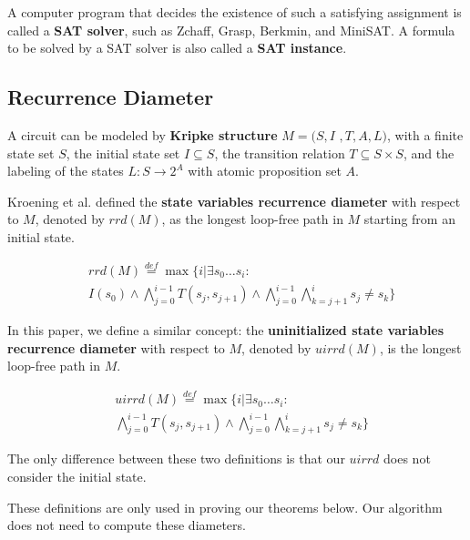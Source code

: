\documentclass[journal]{IEEEtran}
\begin{document}
A computer program that decides the existence of such a satisfying assignment is called a \textbf{SAT solver},
such as Zchaff\cite{CHAFF}, Grasp\cite{grasp}, Berkmin\cite{BERKMIN},
and MiniSAT\cite{EXTSAT}.
A formula to be solved by a SAT solver is also called a \textbf{SAT instance}.

\subsection{Recurrence Diameter}

A circuit can be modeled by \textbf{Kripke structure} $M=(S,I$ $,T,A,L)$,
with a finite state set $S$,
the initial state set $I\subseteq S$,
the transition relation $T\subseteq S\times S$,
and the labeling of the states $L:S\rightarrow 2^{A}$ with atomic proposition set $A$.

Kroening et al. \cite{RecDiam} defined the \textbf{state variables recurrence diameter} with respect to $M$,
denoted by $rrd(M)$,
as the longest loop-free path in $M$ starting from an initial state.

\begin{equation}\label{equ_svrd}
\begin{split}
&rrd(M)\overset{def}{=}\max\{i|\exists s_0 \dots s_i:\\
& I(s_0)\wedge \bigwedge^{i-1}_{j=0}T(s_j,s_{j+1})\wedge\bigwedge^{i-1}_{j=0}\bigwedge^{i}_{k=j+1}s_{j}\ne s_{k}\}
\end{split}
\end{equation}

In this paper,
we define a similar concept: the \textbf{uninitialized state variables recurrence diameter} with respect to $M$,
denoted by $uirrd(M)$,
is the longest loop-free path in $M$.

\begin{equation}\label{equ_uisvrd}
\begin{split}
&uirrd(M)\overset{def}{=}\max\{i|\exists s_0 \dots s_i:\\
&\bigwedge^{i-1}_{j=0}T(s_j,s_{j+1})\wedge\bigwedge^{i-1}_{j=0}\bigwedge^{i}_{k=j+1}s_{j}\ne s_{k}\}
\end{split}
\end{equation}

The only difference between these two definitions is that
our $uirrd$ does not consider the initial state.

These definitions are only used in proving our theorems below.
Our algorithm does not need to compute these diameters.
\end{document}
